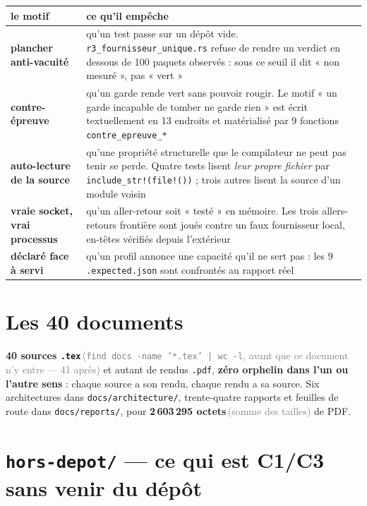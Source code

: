 \documentclass[10pt]{report}
\newcommand{\code}[1]{\texttt{\small #1}}
\newcommand{\mesure}[2]{\textbf{#1}\,\footnotesize\textcolor{grey}{(#2)}\normalsize}
\begin{document}
\begin{longtable}{@{}p{5.0cm}p{10.0cm}@{}}
\toprule \textbf{le motif} & \textbf{ce qu'il empêche} \\ \midrule \endhead
\textbf{plancher anti-vacuité} & qu'un test passe sur un dépôt vide. \code{r3\_fournisseur\_unique.rs} refuse de rendre un verdict en dessous de 100 paquets observés : sous ce seuil il dit « non mesuré », pas « vert » \\
\textbf{contre-épreuve} & qu'un garde rende vert sans pouvoir rougir. Le motif « un garde incapable de tomber ne garde rien » est écrit textuellement en 13 endroits et matérialisé par 9 fonctions \code{contre\_epreuve\_*} \\
\textbf{auto-lecture de la source} & qu'une propriété structurelle que le compilateur ne peut pas tenir se perde. Quatre tests lisent \emph{leur propre fichier} par \code{include\_str!(file!())} ; trois autres lisent la source d'un module voisin \\
\textbf{vraie socket, vrai processus} & qu'un aller-retour soit « testé » en mémoire. Les trois allers-retours frontière sont joués contre un faux fournisseur local, en-têtes vérifiés depuis l'extérieur \\
\textbf{déclaré face à servi} & qu'un profil annonce une capacité qu'il ne sert pas : les 9 \code{*.expected.json} sont confrontés au rapport réel \\
\bottomrule
\end{longtable}

\section{Les 40 documents}

\mesure{40 sources \code{.tex}}{\code{find docs -name '*.tex' | wc -l}, avant que ce document n'y
entre --- 41 après} et autant de rendus \code{.pdf}, \textbf{zéro orphelin dans l'un ou l'autre sens} : chaque
source a son rendu, chaque rendu a sa source. Six architectures dans \code{docs/architecture/},
trente-quatre rapports et feuilles de route dans \code{docs/reports/}, pour
\mesure{2\,603\,295 octets}{somme des tailles} de PDF.

\section{\code{hors-depot/} --- ce qui est C1/C3 sans venir du dépôt}
\end{document}

